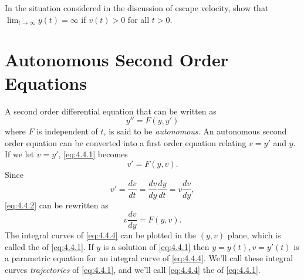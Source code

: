 \begin{exerciselist}
\item\label{exer:4.3.20}In the situation considered in the discussion of escape velocity, show
that $\lim_{t\to\infty}y(t)=\infty$ if $v(t)>0$ for all $t>0$.


\end{exerciselist}


\section{Autonomous Second Order Equations}\label{sec:auto_second_order}

A second order differential equation that can be written as
\begin{equation} \label{eq:4.4.1}
y''=F(y,y')
\end{equation}
where $F$ is independent of $t$, is said to be \emph{\color{blue}autonomous}.
An autonomous second order equation can be converted into a first
order equation relating $v=y'$ and $y$. If we let $v=y'$,
\eqref{eq:4.4.1} becomes
\begin{equation} \label{eq:4.4.2}
v'=F(y,v).
\end{equation}
Since
\begin{equation} \label{eq:4.4.3}
v'=\frac{dv}{dt}=\frac{dv}{dy}\frac{dy}{dt}=v\frac{dv}{dy},
\end{equation}
\eqref{eq:4.4.2} can be rewritten as
\begin{equation} \label{eq:4.4.4}
v\frac{dv}{dy}=F(y,v).
\end{equation}
The integral curves of \eqref{eq:4.4.4} can be plotted in the $(y,v)$
plane, which is called the
 of \eqref{eq:4.4.1}. If $y$ is a solution of
\eqref{eq:4.4.1}
then $y=y(t), v=y'(t)$ is a parametric equation for an integral curve
of \eqref{eq:4.4.4}. We'll call these integral curves
\emph{\color{blue}trajectories}
of \eqref{eq:4.4.1}, and we'll call
\eqref{eq:4.4.4} the  of \eqref{eq:4.4.1}.

